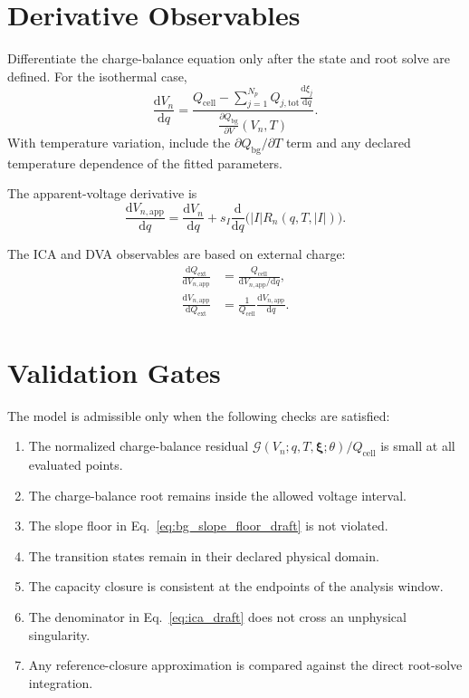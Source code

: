 \documentclass[11pt,a4paper]{article}
\newcommand{\dd}{\mathrm{d}}
\newcommand{\app}{\mathrm{app}}
\newcommand{\bg}{\mathrm{bg}}
\newcommand{\cell}{\mathrm{cell}}
\newcommand{\ext}{\mathrm{ext}}
\newcommand{\tot}{\mathrm{tot}}
\begin{document}
\section{Derivative Observables}

Differentiate the charge-balance equation only after the state and root solve
are defined.  For the isothermal case,
\begin{equation}
\frac{\dd V_n}{\dd q}
=
\frac{
Q_{\cell}
-\sum_{j=1}^{N_p}Q_{j,\tot}\frac{\dd \xi_j}{\dd q}
}{
\frac{\partial Q_{\bg}}{\partial V}(V_n,T)
}.
\label{eq:dVdq_iso_draft}
\end{equation}
With temperature variation, include the \(\partial Q_{\bg}/\partial T\) term
and any declared temperature dependence of the fitted parameters.

The apparent-voltage derivative is
\begin{equation}
\frac{\dd V_{n,\app}}{\dd q}
=
\frac{\dd V_n}{\dd q}
+s_I\frac{\dd}{\dd q}\bigl(|I|R_n(q,T,|I|)\bigr).
\label{eq:dVappdq_draft}
\end{equation}

The ICA and DVA observables are based on external charge:
\begin{align}
\frac{\dd Q_{\ext}}{\dd V_{n,\app}}
&=
\frac{Q_{\cell}}{\dd V_{n,\app}/\dd q},
\label{eq:ica_draft}\\
\frac{\dd V_{n,\app}}{\dd Q_{\ext}}
&=
\frac{1}{Q_{\cell}}
\frac{\dd V_{n,\app}}{\dd q}.
\label{eq:dva_draft}
\end{align}

\section{Validation Gates}

The model is admissible only when the following checks are satisfied:
\begin{enumerate}[label=\arabic*.]
\item The normalized charge-balance residual
  \(\mathcal G(V_n;q,T,\bm{\xi};\theta)/Q_{\cell}\) is small at all evaluated
  points.
\item The charge-balance root remains inside the allowed voltage interval.
\item The slope floor in Eq.~\eqref{eq:bg_slope_floor_draft} is not violated.
\item The transition states remain in their declared physical domain.
\item The capacity closure is consistent at the endpoints of the analysis
  window.
\item The denominator in Eq.~\eqref{eq:ica_draft} does not cross an
  unphysical singularity.
\item Any reference-closure approximation is compared against the direct
  root-solve integration.
\end{enumerate}
\end{document}
